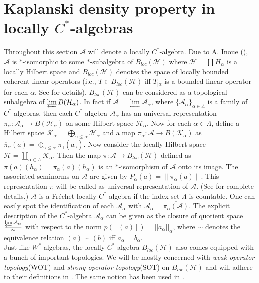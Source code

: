 \documentclass[10pt]{article}
\theoremstyle{definition}
\begin{document}
	\section{ Kaplanski density property in locally $C^*$-algebras}
	Throughout this section $\mathcal A$ will denote a locally $C^*$-algebra. Due to A. Inoue (\cite[Th. 5.1]{Inoue}), $\mathcal A$ is $*$-isomorphic to some $\ast$-subalgebra of $B_{loc}(\mathcal H)$ where $\mathcal H=\coprod H_\alpha$ is a locally Hilbert space and $B_{loc}(\mathcal H)$ denotes the space of locally bounded coherent linear operators (i.e., $T\in B_{loc}(\mathcal H)$ iff $T_{|\alpha}$ is a bounded linear operator for each $\alpha$. See \cite[II.7.5]{Maria2} for details). $B_{loc}(\mathcal H)$ can be considered as a topological subalgebra of $\varprojlim B(\mathcal H_\alpha)$. In fact if $\mathcal A=\underset{\longleftarrow}{\lim}\mathcal A_\alpha$, where $\{\mathcal A_\alpha\}_{\alpha\in \Lambda}$ is a family of $C^*$-algebras, then each $C^*$-algebra $\mathcal A_\alpha$ has an universal representation $\pi_\alpha:\mathcal A_\alpha\to B(\mathcal H_\alpha)$ on some Hilbert space $\mathcal H_\alpha$. Now for each $\alpha\in \Lambda$, define a Hilbert space $\mathcal K_\alpha=\bigoplus_{\gamma\leq \alpha}\mathcal H_\alpha$ and a map $\overline{\pi}_\alpha:\mathcal A\to B(\mathcal K_\alpha)$ as $\overline{\pi}_\alpha(a)=\oplus_{\gamma\leq \alpha} \pi_\gamma(a_\gamma)$. Now consider the locally Hilbert space $\mathcal H=\coprod_{\alpha\in \Lambda}\mathcal K_\alpha$. Then the map $\pi:\mathcal A\to B_{loc}(\mathcal H)$ defined as $\pi(a)(h_\alpha)=\overline{\pi}_\alpha(a)(h_\alpha)$ is an $*$-isomorphism of $\mathcal A$ onto its image. The associated seminorms on $\mathcal A$ are given by $P_\alpha(a)=\|\overline{\pi}_\alpha(a)\|$. This representation $\pi$ will be called as universal representation of $\mathcal A$. (See \cite[II.8.5]{Maria} for complete details.) $\mathcal A$ is a Fr\'echet locally $C^*$-algebra if the index set $\Lambda$ is countable.
	One can easily spot the identification of each $\mathcal A_\alpha$ with $\mathcal A_\alpha=\overline{\overline{\pi}_\alpha(\mathcal A)}$. The explicit description of the $C^*$-algebra $\mathcal A_\alpha$ can be given as the closure of quotient space $\frac{\varprojlim \mathcal A_\alpha}{\sim}$ with respect to the norm $p([(a)])=||a_\alpha||_\alpha$, where $\sim$ denotes the equivalence relation $(a)\sim (b)$ iff $a_\alpha=b_\alpha$.\\
	
	Just like $W^*$-algebras, the locally $C^*$-algebra $B_{loc}(\mathcal H)$ also comes equipped with a bunch of important topologies. We will be mostly concerned with \emph{weak operator topology}(WOT) and \emph{strong operator topology}(SOT) on $B_{loc}(\mathcal H)$ and will adhere to their definitions in \cite[3, Def. 3.1]{Joita}. The same notion has been used in \cite{Maria}.\\
	
\end{document}
